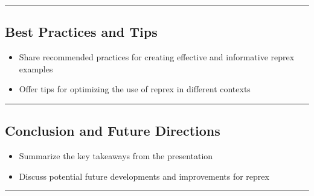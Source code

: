 \documentclass[
  letterpaper,
  DIV=11,
  numbers=noendperiod]{scrartcl}
\providecommand{\tightlist}{%
  \setlength{\itemsep}{0pt}\setlength{\parskip}{0pt}}\usepackage{longtable,booktabs,array}
\begin{document}
\begin{center}\rule{0.5\linewidth}{0.5pt}\end{center}

\hypertarget{best-practices-and-tips}{%
\subsection{Best Practices and Tips}\label{best-practices-and-tips}}

\begin{itemize}
\tightlist
\item
  Share recommended practices for creating effective and informative
  reprex examples
\item
  Offer tips for optimizing the use of reprex in different contexts
\end{itemize}

\begin{center}\rule{0.5\linewidth}{0.5pt}\end{center}

\hypertarget{conclusion-and-future-directions}{%
\subsection{Conclusion and Future
Directions}\label{conclusion-and-future-directions}}

\begin{itemize}
\tightlist
\item
  Summarize the key takeaways from the presentation
\item
  Discuss potential future developments and improvements for reprex
\end{itemize}

\begin{center}\rule{0.5\linewidth}{0.5pt}\end{center}
\end{document}
